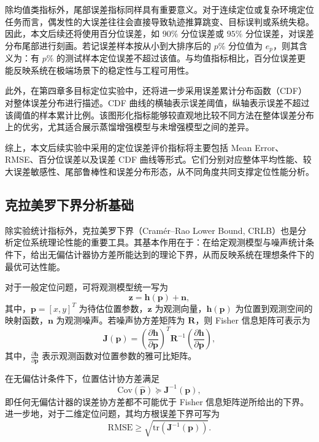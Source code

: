 除均值类指标外，尾部误差指标同样具有重要意义。对于连续定位或复杂环境定位任务而言，偶发性的大误差往往会直接导致轨迹推算跳变、目标误判或系统失稳。因此，本文后续还将使用百分位误差，如 $90\%$ 分位误差或 $95\%$ 分位误差，对误差分布尾部进行刻画。若记误差样本按从小到大排序后的 $p\%$ 分位值为 $e_{p}$，则其含义为：有 $p\%$ 的测试样本定位误差不超过该值。与均值指标相比，百分位误差更能反映系统在极端场景下的稳定性与工程可用性。

此外，在第四章多目标定位实验中，还将进一步采用误差累计分布函数（CDF）对整体误差分布进行描述。CDF 曲线的横轴表示误差阈值，纵轴表示误差不超过该阈值的样本累计比例。该图形化指标能够较直观地比较不同方法在整体误差分布上的优劣，尤其适合展示蒸馏增强模型与未增强模型之间的差异。

综上，本文后续实验中采用的定位误差评价指标将主要包括 Mean Error、RMSE、百分位误差以及误差 CDF 曲线等形式。它们分别对应整体平均性能、较大误差敏感性、尾部鲁棒性和误差分布形态，从不同角度共同支撑定位性能分析。

\subsection{克拉美罗下界分析基础}
\label{subsec:2_5_2}

除实验统计指标外，克拉美罗下界（Cramér--Rao Lower Bound, CRLB）也是分析定位系统理论性能的重要工具。其基本作用在于：在给定观测模型与噪声统计条件下，给出无偏估计器协方差所能达到的理论下界，从而反映系统在理想条件下的最优可达性能。

对于一般定位问题，可将观测模型统一写为
\begin{equation}
\mathbf{z}
=
\mathbf{h}(\mathbf{p})
+
\mathbf{n},
\label{eq:2_41_general_obs}
\end{equation}
其中，$\mathbf{p}=[x,y]^T$ 为待估位置参数，$\mathbf{z}$ 为观测向量，$\mathbf{h}(\mathbf{p})$ 为位置到观测空间的映射函数，$\mathbf{n}$ 为观测噪声。若噪声协方差矩阵为 $\mathbf{R}$，则 Fisher 信息矩阵可表示为
\begin{equation}
\mathbf{J}(\mathbf{p})
=
\left(
\frac{\partial \mathbf{h}}{\partial \mathbf{p}}
\right)^T
\mathbf{R}^{-1}
\left(
\frac{\partial \mathbf{h}}{\partial \mathbf{p}}
\right),
\label{eq:2_42_fim}
\end{equation}
其中，$\frac{\partial \mathbf{h}}{\partial \mathbf{p}}$ 表示观测函数对位置参数的雅可比矩阵。

在无偏估计条件下，位置估计协方差满足
\begin{equation}
\mathrm{Cov}(\hat{\mathbf{p}})
\succeq
\mathbf{J}^{-1}(\mathbf{p}),
\label{eq:2_43_crlb_cov}
\end{equation}
即任何无偏估计器的误差协方差都不可能优于 Fisher 信息矩阵逆所给出的下界。进一步地，对于二维定位问题，其均方根误差下界可写为
\begin{equation}
\mathrm{RMSE}
\ge
\sqrt{
\mathrm{tr}
\left(
\mathbf{J}^{-1}(\mathbf{p})
\right)
}.
\label{eq:2_44_crlb_rmse}
\end{equation}

